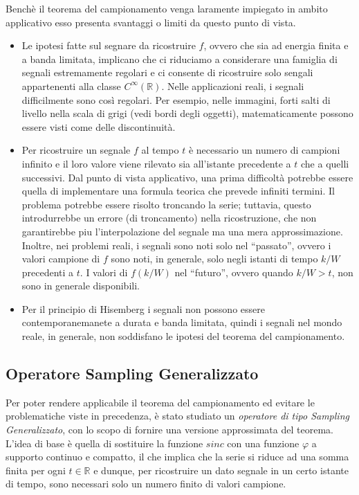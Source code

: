Benchè il teorema del campionamento venga laramente impiegato in ambito applicativo
esso presenta svantaggi o limiti da questo punto di vista.

\begin{itemize}
    \item Le ipotesi fatte sul segnare da ricostruire $f$, ovvero che sia ad energia finita
          e a banda limitata, implicano che ci riduciamo a considerare una famiglia di segnali
          estremamente regolari e ci consente di ricostruire solo sengali appartenenti alla classe
          $C^{\infty}(\mathbb{R})$. Nelle applicazioni reali, i segnali difficilmente sono così
          regolari. Per esempio, nelle immagini, forti salti di livello nella scala di grigi
          (vedi bordi degli oggetti), matematicamente possono essere visti come delle
          discontinuità.
    \item Per ricostruire un segnale $f$ al tempo $t$ è necessario un numero di campioni infinito
          e il loro valore viene rilevato sia all'istante precedente a $t$ che a quelli successivi.
          Dal punto di vista applicativo, una prima difficoltà potrebbe essere quella di
          implementare una formula teorica che prevede infiniti termini.
          Il problema potrebbe essere risolto troncando la serie; tuttavia, questo introdurrebbe
          un errore (di troncamento) nella ricostruzione, che non garantirebbe piu
          l’interpolazione del segnale ma una mera approssimazione.
          Inoltre, nei problemi reali, i segnali sono noti solo nel “passato”, ovvero i
          valori campione di $f$ sono noti, in generale, solo negli istanti di tempo $k/W$
          precedenti a $t$. I valori di $f(k/W)$ nel “futuro”, ovvero quando $k/W > t$,
          non sono in generale disponibili.
    \item Per il principio di Hisemberg i segnali non possono essere contemporanemanete
          a durata e banda limitata, quindi i segnali nel mondo reale, in generale, non soddisfano
          le ipotesi del teorema del campionamento.
\end{itemize}

\subsection{Operatore Sampling Generalizzato}

Per poter rendere applicabile il teorema del campionamento ed evitare le
problematiche viste in precedenza, è stato studiato un \textit{operatore di tipo
    Sampling Generalizzato}, con lo scopo di fornire una versione approssimata del
teorema. L'idea di base è quella di sostituire la funzione $sinc$ con una
funzione $\varphi$ a supporto continuo e compatto, il che implica che la serie
si riduce ad una somma finita per ogni $t \in \mathbb{R}$ e dunque, per ricostruire
un dato segnale in un certo istante di tempo, sono necessari solo un numero
finito di valori campione.\\

